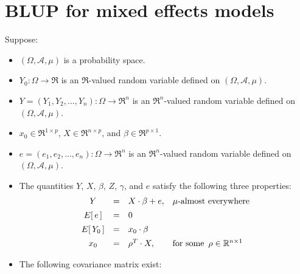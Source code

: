 

\section{BLUP for mixed effects models}
\setcounter{theorem}{0}
\setcounter{equation}{0}

\renewcommand{\theenumi}{\roman{enumi}}
\renewcommand{\labelenumi}{\textnormal{(\theenumi)}$\;\;$}


\begin{theorem}
\label{AMixedModelEquivalentFixedModel}
\mbox{}
\vskip 0.2cm
\noindent
Suppose:
\begin{itemize}
\item
	$(\Omega,\mathcal{A},\mu)$ is a probability space.
\item
	$Y_{0} : \Omega \longrightarrow \Re$ is an $\Re$-valued random variable
	defined on $(\Omega,\mathcal{A},\mu)$.
\item
	$Y = (Y_{1}, Y_{2}, \ldots, Y_{n}) : \Omega \longrightarrow \Re^{n}$ is an $\Re^{n}$-valued random variable
	defined on $(\Omega,\mathcal{A},\mu)$.
\item
	$x_{0} \in \Re^{1 \times p}$, $X \in \Re^{n \times p}$, and $\beta \in \Re^{p \times 1}$.
\item
	$e = (e_{1}, e_{2}, \ldots, e_{n}) : \Omega \longrightarrow \Re^{n}$ is an $\Re^{n}$-valued random variable
	defined on $(\Omega,\mathcal{A},\mu)$.
\item
	The quantities $Y$, $X$, $\beta$, $Z$, $\gamma$, and $e$ satisfy the following three properties:
	\begin{equation*}
	\begin{array}{ccll}
	Y & = & X \cdot \beta + e, & \textnormal{$\mu$-almost everywhere}
	\\
	E\!\left[\,e\,\right] &\overset{{\color{white}\vert}}{=}& 0
	\\
	E\!\left[\,Y_{0}\,\right] &\overset{{\color{white}\vert}}{=}& x_{0} \cdot \beta
	\\
	x_{0} &\overset{{\color{white}\vert}}{=}& \rho^{T} \cdot X, & \textnormal{for some \,$\rho \in \Re^{n \times 1}$}
	\end{array}
	\end{equation*}
\item
	The following covariance matrix exist:

\end{itemize}
\end{theorem}
